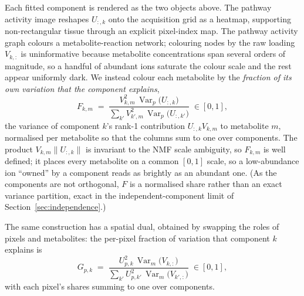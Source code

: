 \documentclass[11pt]{article}
\begin{document}
Each fitted component is rendered as the two objects above. The pathway activity image
reshapes $U_{:,k}$ onto the acquisition grid as a heatmap, supporting non-rectangular tissue
through an explicit pixel-index map. The pathway activity graph colours a metabolite-reaction
network; colouring nodes by the raw loading $V_{k,:}$ is uninformative because metabolite
concentrations span several orders of magnitude, so a handful of abundant ions saturate the
colour scale and the rest appear uniformly dark. We instead colour each metabolite by the
\emph{fraction of its own variation that the component explains},
\begin{equation}
  F_{k,m} \;=\; \frac{V_{k,m}^2\,\operatorname{Var}_p\!\big(U_{:,k}\big)}
                     {\sum_{k'} V_{k',m}^2\,\operatorname{Var}_p\!\big(U_{:,k'}\big)}
            \;\in[0,1],
  \label{eq:explained}
\end{equation}
the variance of component $k$'s rank-1 contribution $U_{:,k}V_{k,m}$ to metabolite $m$,
normalised per metabolite so that the columns sum to one over components. The product
$V_{k,m}\lVert U_{:,k}\rVert$ is invariant to the NMF scale ambiguity, so $F_{k,m}$ is well
defined; it places every metabolite on a common $[0,1]$ scale, so a low-abundance ion
``owned'' by a component reads as brightly as an abundant one. (As the components are not
orthogonal, $F$ is a normalised share rather than an exact variance partition, exact in the
independent-component limit of Section~\ref{sec:independence}.)

The same construction has a spatial dual, obtained by swapping the roles of pixels and
metabolites: the per-pixel fraction of variation that component $k$ explains is
\begin{equation}
  G_{p,k} \;=\; \frac{U_{p,k}^2\,\operatorname{Var}_m\!\big(V_{k,:}\big)}
                     {\sum_{k'} U_{p,k'}^2\,\operatorname{Var}_m\!\big(V_{k',:}\big)}
            \;\in[0,1],
  \label{eq:spatial-explained}
\end{equation}
with each pixel's shares summing to one over components.
\end{document}
